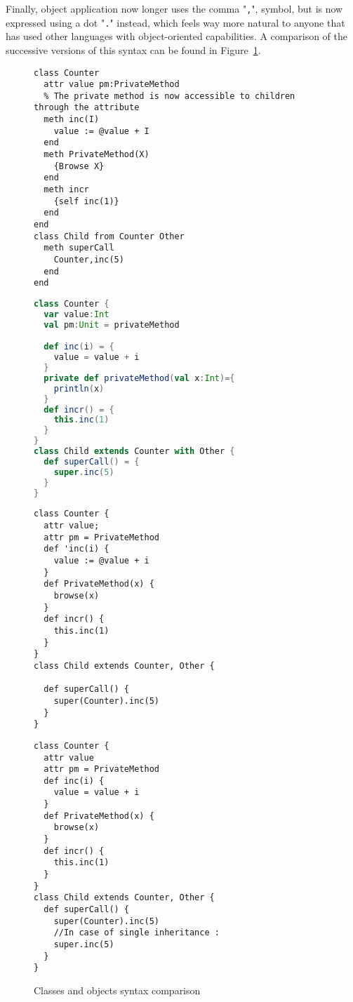 Finally, object application now longer uses the comma "\texttt{,}", symbol, but is now expressed using a dot "\texttt{.}" instead, which feels way more natural to anyone that has used other languages with object-oriented capabilities.\newline
A comparison of the successive versions of this syntax can be found in Figure~\ref{fig:code-comp-obj}.
\begin{figure}
    \noindent\begin{minipage}{.49\textwidth}
\begin{lstlisting}[title={Oz},language=oz]
class Counter
  attr value pm:PrivateMethod
  % The private method is now accessible to children through the attribute
  meth inc(I)
    value := @value + I
  end
  meth PrivateMethod(X)
    {Browse X}
  end
  meth incr
    {self inc(1)}
  end
end
class Child from Counter Other
  meth superCall
    Counter,inc(5)
  end
end
\end{lstlisting}
    \end{minipage}
    \hfill
    \noindent\begin{minipage}{.49\textwidth}
\begin{lstlisting}[title={Scala/Ozma},language=scala]
class Counter {
  var value:Int
  val pm:Unit = privateMethod

  def inc(i) = {
    value = value + i
  }
  private def privateMethod(val x:Int)={
    println(x)
  }
  def incr() = {
    this.inc(1)
  }
}
class Child extends Counter with Other {
  def superCall() = {
    super.inc(5)
  }
}
\end{lstlisting}
    \end{minipage}
    \noindent\begin{minipage}{.49\textwidth}
\begin{lstlisting}[title={NewOz 2020},language=newoz]
class Counter {
  attr value;
  attr pm = PrivateMethod
  def 'inc(i) {
    value := @value + i
  }
  def PrivateMethod(x) {
    browse(x)
  }
  def incr() {
    this.inc(1)
  }
}
class Child extends Counter, Other {

  def superCall() {
    super(Counter).inc(5)
  }
}
\end{lstlisting}
    \end{minipage}
    \hfill
    \noindent\begin{minipage}{.49\textwidth}
\begin{lstlisting}[title={NewOz 2021},language=newoz]
class Counter {
  attr value
  attr pm = PrivateMethod
  def inc(i) {
    value = value + i
  }
  def PrivateMethod(x) {
    browse(x)
  }
  def incr() {
    this.inc(1)
  }
}
class Child extends Counter, Other {
  def superCall() {
    super(Counter).inc(5)
    //In case of single inheritance :
    super.inc(5)
  }
}
\end{lstlisting}
    \end{minipage}
\caption{Classes and objects syntax comparison}
\label{fig:code-comp-obj}
\end{figure}

